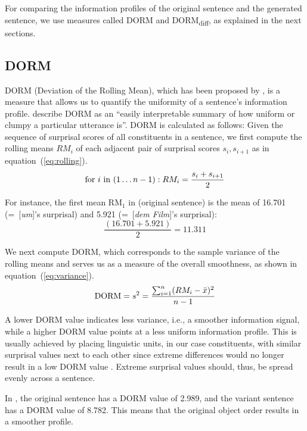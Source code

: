 \documentclass[output=paper,colorlinks,citecolor=brown]{langscibook}
\begin{document}
For comparing the information profiles of the original sentence and the generated sentence, we use measures called DORM and DORM\textsubscript{diff}, as explained in the next sections.

\subsection{DORM}

DORM (Deviation of the Rolling Mean), which has been proposed by \citet{cuskley21}, is a measure that allows us to quantify the uniformity of a sentence's information profile. \citet[9]{cuskley21} describe DORM as an ``easily interpretable summary of how uniform or clumpy a particular utterance is''.
DORM is calculated as follows: Given the sequence of surprisal scores of all constituents in a sentence, we first compute the rolling means $RM_i$ of each adjacent pair of surprisal scores $s_i, s_{i+1}$ as in equation~(\ref{eq:rolling}). 
\begin{equation}
\textnormal{for } i \textnormal{ in } (1\dots n-1): RM_i = \frac{s_i + s_{i+1}}{2}
  \label{eq:rolling}
\end{equation}

For instance, the first mean RM$_1$ in  (original sentence) is the mean of 16.701 (=~[\emph{um}]'s surprisal) and 5.921 (=~[\emph{dem Film}]'s surprisal):
\begin{equation}
\frac{(16.701+5.921)}{2} = 11.311
\end{equation}

We next compute DORM, which corresponds to the sample variance of the rolling means and serves us as a measure of the overall smoothness, as shown in equation~(\ref{eq:variance}).
\begin{equation}
  \textnormal{DORM} = s^2 = \frac{\sum_{i=1}^n (RM_i - \bar{x})^2}{n - 1} \label{eq:variance}
\end{equation}

A lower DORM value indicates less variance, i.e., a smoother information signal, while a higher DORM value points at a less uniform information profile. This is usually achieved by placing linguistic units, in our case constituents, with similar surprisal values next to each other since extreme differences would no longer result in a low DORM value \citep{cuskley21}. Extreme surprisal values should, thus, be spread evenly across a sentence. 

In , the original sentence has a DORM value of 2.989, and the variant sentence has a DORM value of 8.782. This means that the original object order results in a smoother profile.
\end{document}
